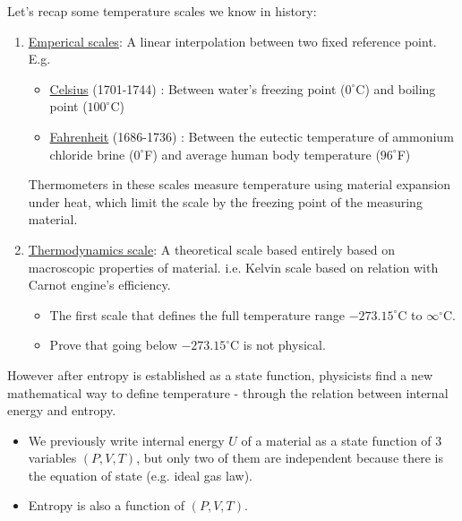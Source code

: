 \documentclass[class=article, crop=false, 12pt]{standalone}
\begin{document}
Let's recap some temperature scales we know in history:
\begin{enumerate}
    \item \ul{Emperical scales}: A linear interpolation between two fixed reference point. E.g.
    \begin{itemize}
        \item \href{https://en.wikipedia.org/wiki/Anders_Celsius}{Celsius} (1701-1744) : 
        Between water's freezing point ($0^\circ$C) and boiling point ($100^\circ$C)

        \item \href{https://en.wikipedia.org/wiki/Daniel_Gabriel_Fahrenheit}{Fahrenheit} (1686-1736) :
        Between the eutectic temperature of ammonium chloride brine ($0^\circ$F) and average human body temperature ($96^\circ$F)
        
    \end{itemize}

    Thermometers in these scales measure temperature using material expansion under heat,
    which limit the scale by the freezing point of the measuring material.

    \item \ul{Thermodynamics scale}: A theoretical scale based entirely based on macroscopic properties of material.
    i.e. Kelvin scale based on relation with Carnot engine's efficiency.

    \begin{itemize}
        \item The first scale that defines the full temperature range $-273.15^\circ$C to $\infty^\circ$C.
        \item Prove that going below $-273.15^\circ$C is not physical.
    \end{itemize}
    
\end{enumerate}

However after entropy is established as a state function,
physicists find a new mathematical way to define temperature - 
through the relation between internal energy and entropy.
\begin{itemize}
    \item We previously write internal energy $U$ of a material as a state function of 3 variables $(P,V,T)$,
    but only two of them are independent because there is the equation of state (e.g. ideal gas law).

    \item Entropy is also a function of $(P,V,T)$.
\end{itemize}
\end{document}
